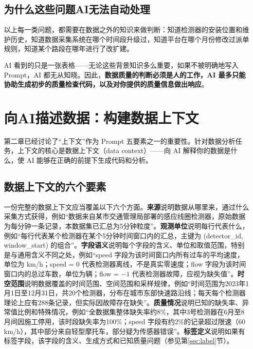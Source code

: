 \subsection{为什么这些问题AI无法自动处理}

以上每一类问题，都需要在数据之外的知识来做判断：知道检测器的安装位置和维护历史，知道数据采集系统在哪个时间段升级过，知道平台在哪个月份修改过派单规则，知道某个路段在哪年进行了改扩建。

AI 看到的只是一张表格——无论这些背景知识多么重要，如果不被明确地写入 Prompt，AI 都无从知晓。因此，\textbf{数据质量的判断必须是人的工作，AI 最多只能协助生成初步的质量检查代码，以及对你提供的质量信息做出响应}。

\section{向AI描述数据：构建数据上下文}

第二章已经讨论了“上下文”作为 Prompt 五要素之一的重要性。针对数据分析任务，上下文的核心是数据上下文（data context）——向 AI 解释你的数据是什么，使 AI 能够在正确的前提下生成代码和分析。

\subsection{数据上下文的六个要素}

一份完整的数据上下文应当覆盖以下六个方面。\textbf{来源}说明数据从哪里来，通过什么采集方式获得，例如“数据来自某市交通管理局部署的感应线圈检测器，原始数据为每分钟一条记录，本数据集已汇总为5分钟粒度”。\textbf{观测单位}说明每行代表什么，例如“每行代表某个检测器在某个5分钟时间窗口内的汇总，主键为 (detector\_id, window\_start) 的组合”。\textbf{字段语义}说明每个字段的含义、单位和取值范围，特别是与通用含义不同之处，例如“speed 字段为该时间窗口内所有过车的平均速度，单位为 km/h；speed = 0 代表检测器离线，不是真实零速度；flow 字段为该时间窗口内的总过车数，单位为辆；flow = $-1$ 代表检测器故障，应视为缺失值”。\textbf{时空范围}说明数据覆盖的时间范围、空间范围和采样规律，例如“时间范围为2023年1月1日至12月31日，共20个检测器，分布在城市东部快速路沿线；每天每个检测器理论上应有288条记录，但实际因故障存在缺失”。\textbf{质量情况}说明已知的缺失率、异常值比例和特殊情况，例如“全数据集整体缺失率约8\%，其中3号检测器在6月至8月间因施工停用，该时段缺失率为100\%；speed 字段有约2\%的记录超过限速（60 km/h），其中部分来自轻型摩托车，部分疑为传感器错误”。\textbf{标签定义}说明如果有标签字段，该字段的含义、生成方式和已知质量问题（参见第\ref{sec:label}节）。

